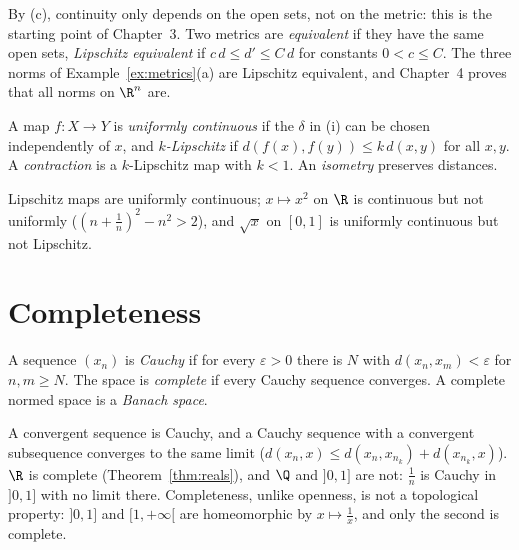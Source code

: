 By (c), continuity only depends on the open sets, not on the metric: this is the starting point of Chapter~3. Two
metrics are \emph{equivalent} if they have the same open sets, \emph{Lipschitz equivalent} if $c\,d\le d'\le C\,d$ for constants
$0<c\le C$. The three norms of Example~\ref{ex:metrics}(a) are Lipschitz equivalent, and Chapter~4 proves that all norms on $\R^n$ are.

\begin{definition}
A map $f:X\to Y$ is \emph{uniformly continuous} if the $\delta$ in (i) can be chosen independently of $x$, and \emph{$k$-Lipschitz} if
$d(f(x),f(y))\le k\,d(x,y)$ for all $x,y$. A \emph{contraction} is a $k$-Lipschitz map with $k<1$. An \emph{isometry} preserves distances.
\end{definition}

Lipschitz maps are uniformly continuous; $x\mapsto x^2$ on $\R$ is continuous but not uniformly ($(n+\frac1n)^2-n^2>2$), and $\sqrt x$
on $[0,1]$ is uniformly continuous but not Lipschitz.

\section{Completeness}

\begin{definition}
A sequence $(x_n)$ is \emph{Cauchy} if for every $\varepsilon>0$ there is $N$ with $d(x_n,x_m)<\varepsilon$ for $n,m\ge N$. The space is \emph{complete} if
every Cauchy sequence converges. A complete normed space is a \emph{Banach space}.
\end{definition}

A convergent sequence is Cauchy, and a Cauchy sequence with a convergent subsequence converges to the same limit
($d(x_n,x)\le d(x_n,x_{n_k})+d(x_{n_k},x)$). $\R$ is complete (Theorem~\ref{thm:reals}), and $\Q$ and $]0,1]$ are not: $\frac1n$ is Cauchy in
$]0,1]$ with no limit there. Completeness, unlike openness, is not a topological property: $]0,1]$ and $[1,+\infty[$ are
homeomorphic by $x\mapsto\frac1x$, and only the second is complete.

